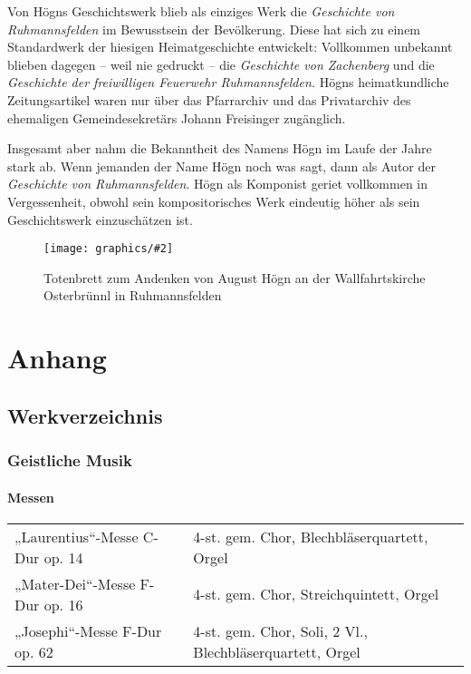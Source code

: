 \documentclass{book}
\newcommand{\img}[2][width=\linewidth]{\noindent\texttt{[image: graphics/\#2]}}
\begin{document}
Von Högns Geschichtswerk blieb als einziges Werk die \textit{Geschichte
von Ruhmannsfelden} im Bewusstsein der Bevölkerung. Diese hat sich zu
einem Standardwerk der hiesigen Heimatgeschichte entwickelt:
Vollkommen unbekannt blieben dagegen – weil nie gedruckt – die
\textit{Geschichte von Zachenberg} und die \textit{Geschichte der
freiwilligen Feuerwehr Ruhmannsfelden.} Högns heimatkundliche
Zeitungsartikel waren nur über das Pfarrarchiv und das Privatarchiv
des ehemaligen Gemeindesekretärs Johann Freisinger zugänglich.

Insgesamt aber nahm die Bekanntheit des Namens Högn im Laufe der Jahre
stark ab. Wenn jemanden der Name Högn noch was sagt, dann als Autor
der \textit{Geschichte von Ruhmannsfelden}. Högn als Komponist geriet
vollkommen in Vergessenheit, obwohl sein kompositorisches Werk
eindeutig höher als sein Geschichtswerk einzuschätzen ist.

\begin{figure}
\centering
\img[width=6cm]{Totenbrett}
\caption{Totenbrett zum Andenken von August Högn an der Wallfahrtskirche Osterbrünnl in Ruhmannsfelden}
\end{figure}


\chapter{Anhang}
\section{Werkverzeichnis}

\subsection{Geistliche Musik}

\newcommand{\klein}[1]{\tiny#1}

\newenvironment{tabelle}{\begin{tabular}{p{8cm}l}}{\end{tabular}}

\subsubsection{Messen}

\begin{tabelle}
„Laurentius“-Messe C-Dur op. 14 &
\klein{4-st. gem. Chor, Blechbläserquartett, Orgel}\\

„Mater-Dei“-Messe F-Dur op. 16 &
\klein{4-st. gem. Chor, Streichquintett, Orgel}\\

„Josephi“-Messe F-Dur op. 62 &
\klein{4-st. gem. Chor, Soli, 2 Vl., Blechbläserquartett, Orgel}\\
\end{tabelle}
\end{document}
